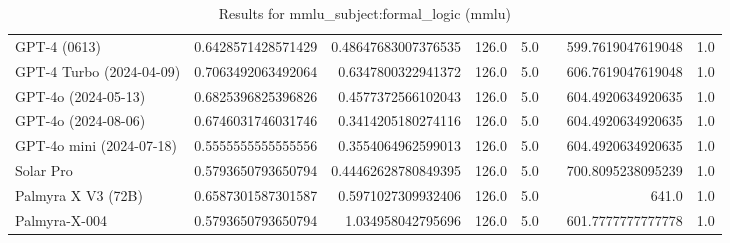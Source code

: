 \begin{table}[htp]
{\begin{tabular}{lrrrrrrr}
GPT-4 (0613) & 0.6428571428571429 & 0.48647683007376535 & 126.0 & 5.0 &  & 599.7619047619048 & 1.0 \\
GPT-4 Turbo (2024-04-09) & 0.7063492063492064 & 0.6347800322941372 & 126.0 & 5.0 &  & 606.7619047619048 & 1.0 \\
GPT-4o (2024-05-13) & 0.6825396825396826 & 0.4577372566102043 & 126.0 & 5.0 &  & 604.4920634920635 & 1.0 \\
GPT-4o (2024-08-06) & 0.6746031746031746 & 0.3414205180274116 & 126.0 & 5.0 &  & 604.4920634920635 & 1.0 \\
GPT-4o mini (2024-07-18) & 0.5555555555555556 & 0.3554064962599013 & 126.0 & 5.0 &  & 604.4920634920635 & 1.0 \\
Solar Pro & 0.5793650793650794 & 0.44462628780849395 & 126.0 & 5.0 &  & 700.8095238095239 & 1.0 \\
Palmyra X V3 (72B) & 0.6587301587301587 & 0.5971027309932406 & 126.0 & 5.0 &  & 641.0 & 1.0 \\
Palmyra-X-004 & 0.5793650793650794 & 1.034958042795696 & 126.0 & 5.0 &  & 601.7777777777778 & 1.0 \\
\bottomrule
\end{tabular}}
\caption{Results for mmlu_subject:formal_logic (mmlu)}
\label{fig:mmlu_subject:formal_logic (mmlu)}
\end{table}